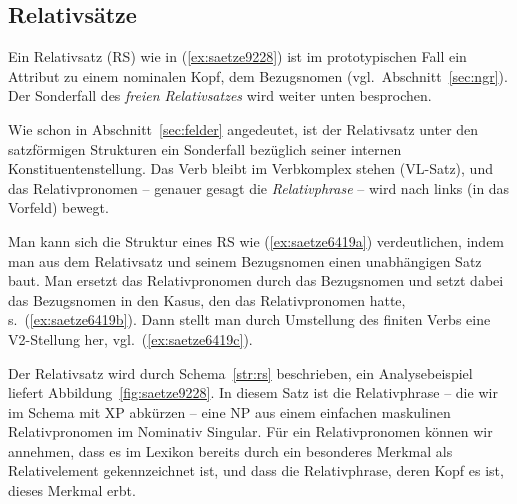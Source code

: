 \begin{exe}
  \ex\label{ex:saetze1450} 
  \begin{xlist}
  \end{xlist}
\end{exe}

\subsection{Relativsätze}

\label{sec:relativsaetze}

Ein Relativsatz (RS) wie in (\ref{ex:saetze9228}) ist im prototypischen Fall ein Attribut zu einem nominalen Kopf, dem Bezugsnomen (vgl.\ Abschnitt~\ref{sec:ngr}).
Der Sonderfall des \textit{freien Relativsatzes} wird weiter unten besprochen.

\begin{exe}
\end{exe}

Wie schon in Abschnitt~\ref{sec:felder} angedeutet, ist der Relativsatz unter den satzförmigen Strukturen ein Sonderfall bezüglich seiner internen Konstituentenstellung.
Das Verb bleibt im Verbkomplex stehen (VL-Satz), und das Relativpronomen -- genauer gesagt die \textit{Relativphrase} -- wird nach links (in das Vorfeld) bewegt.

Man kann sich die Struktur eines RS wie (\ref{ex:saetze6419a}) verdeutlichen, indem man aus dem Relativsatz und seinem Bezugsnomen einen unabhängigen Satz baut.
Man ersetzt das Relativpronomen durch das Bezugsnomen und setzt dabei das Bezugsnomen in den Kasus, den das Relativpronomen hatte, s.\ (\ref{ex:saetze6419b}). 
Dann stellt man durch Umstellung des finiten Verbs eine V2-Stellung her, vgl.\ (\ref{ex:saetze6419c}).

\begin{exe}
  \ex\label{ex:saetze6419}
  \begin{xlist}
  \end{xlist}
\end{exe}


Der Relativsatz wird durch Schema~\ref{str:rs} beschrieben, ein Analysebeispiel liefert Abbildung~\ref{fig:saetze9228}.
In diesem Satz ist die Relativphrase -- die wir im Schema mit XP abkürzen -- eine NP aus einem einfachen maskulinen Relativpronomen im Nominativ Singular.
Für ein Relativpronomen können wir annehmen, dass es im Lexikon bereits durch ein besonderes Merkmal als Relativelement gekennzeichnet ist, und dass die Relativphrase, deren Kopf es ist, dieses Merkmal erbt.

